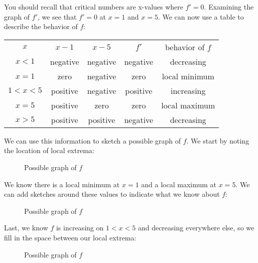 You should recall that critical numbers are x-values where $f'=0$. Examining the graph of $f'$, we see that $f'=0$ at $x=1$ and $x=5$. We can now use a table to describe the behavior of $f$:

\begin{tabular}{c|c|c|c|c}
$x$ & $x-1$ & $x-5$ & $f'$ & behavior of $f$\\
$x<1$ & negative & negative & negative & decreasing\\
$x=1$ & zero & negative & zero & local minimum\\
$1<x<5$ & positive & negative & positive & increasing\\
$x=5$ & positive & zero & zero & local maximum\\
$x>5$ & positive & positive & negative & decreasing\\
\end{tabular}

We can use this information to sketch a possible graph of $f$. We start by noting the location of local extrema:
\begin{figure}[htbp]
	\centering
	\caption{Possible graph of $f$}
	\label{fig:sketchf2}
\end{figure}

We know there is a local minimum at $x=1$ and a local maximum at $x=5$. We can add sketches around these values to indicate what we know about $f$:
\begin{figure}[htbp]
	\centering
	\caption{Possible graph of $f$}
	\label{fig:sketchf3}
\end{figure}

Last, we know $f$ is increasing on $1<x<5$ and decreasing everywhere else, so we fill in the space between our local extrema:
\begin{figure}[htbp]
	\centering
	\caption{Possible graph of $f$}
	\label{fig:sketchf4}
\end{figure}

